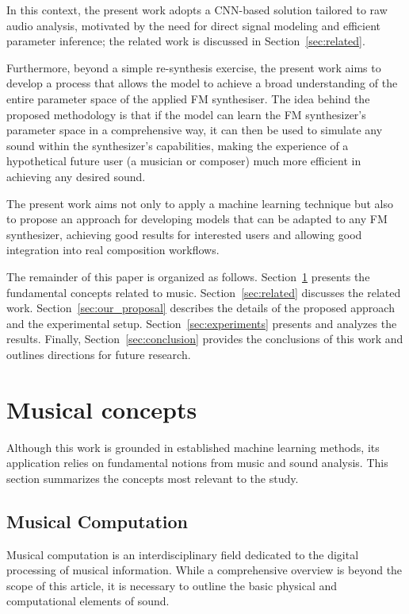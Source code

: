 \documentclass[10pt,conference]{IEEEtran}
\begin{document}
In this context, the present work adopts a CNN-based solution tailored to raw audio analysis, motivated by the need for direct signal modeling and efficient parameter inference; the related work is discussed in Section~\ref{sec:related}.

Furthermore, beyond a simple re-synthesis exercise, the present work aims to develop a process that allows the model to achieve a broad understanding of the entire parameter space of the applied FM synthesiser. The idea behind the proposed methodology is that if the model can learn the FM synthesizer’s parameter space in a comprehensive way, it can then be used to simulate any sound within the synthesizer’s capabilities, making the experience of a hypothetical future user (a musician or composer) much more efficient in achieving any desired sound.

The present work aims not only to apply a machine learning technique but also to propose an approach for developing models that can be adapted to any FM synthesizer, achieving good results for interested users and allowing good integration into real composition workflows.

The remainder of this paper is organized as follows. Section~\ref{sec:fund} presents the fundamental concepts related to music. Section~\ref{sec:related} discusses the related work. Section~\ref{sec:our_proposal} describes the details of the proposed approach and the experimental setup. Section~\ref{sec:experiments} presents and analyzes the results. Finally, Section~\ref{sec:conclusion} provides the conclusions of this work and outlines directions for future research.

\section{Musical concepts} \label{sec:fund} 

Although this work is grounded in established machine learning methods, its application relies on fundamental notions from music and sound analysis. This section summarizes the concepts most relevant to the study.

\subsection{Musical Computation}

Musical computation is an interdisciplinary field dedicated to the digital processing of musical information. While a comprehensive overview is beyond the scope of this article, it is necessary to outline the basic physical and computational elements of sound.
\end{document}
